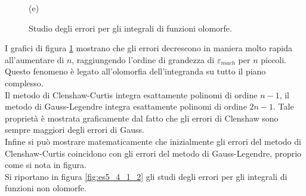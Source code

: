 \documentclass[letterpaper, 12pt]{article}
\numberwithin{equation}{section}    %
\begin{document}
\begin{figure}[!ht]
\begin{minipage}[b]{0.47\textwidth}
        \caption*{(e)}
    \end{minipage}
    \caption{Studio degli errori per gli integrali di funzioni olomorfe.}
    \label{fig:es5_4_1_1}
\end{figure}

I grafici di figura \ref{fig:es5_4_1_1} mostrano che gli errori decrescono in maniera molto rapida all'aumentare
di $n$, raggiungendo l'ordine di grandezza di $\varepsilon_{mach}$ per $n$ piccoli. Questo fenomeno è legato 
all'olomorfia dell'integranda su tutto il piano complesso. \\
Il metodo di Clenshaw-Curtis integra esattamente polinomi di ordine $n-1$, il metodo di Gauss-Legendre integra
esattamente polinomi di ordine $2n-1$. Tale proprietà è mostrata graficamente dal fatto che gli errori
di Clenshaw sono sempre maggiori degli errori di Gauss.\\
Infine si può mostrare matematicamente che inizialmente gli errori del metodo di Clenshaw-Curtis coincidono
con gli errori del metodo di Gauss-Legendre, proprio come si nota in figura.\\
Si riportano in figura \ref{fig:es5_4_1_2} gli studi degli errori per gli integrali di funzioni non olomorfe.
\end{document}
